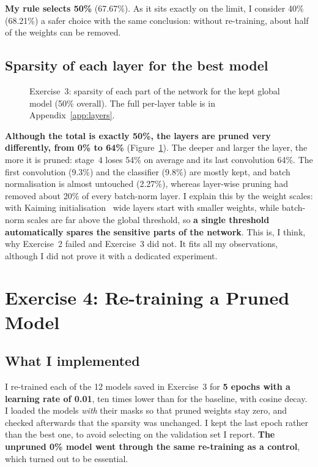 \documentclass[11pt,a4paper]{article}
\begin{document}
\textbf{My rule selects 50\%} (67.67\%). As it sits exactly on the limit, I consider 40\% (68.21\%) a safer choice with the same conclusion: without re-training, about half of the weights can be removed.

\subsection{Sparsity of each layer for the best model}

\begin{figure}[H]
\centering

\caption{Exercise~3: sparsity of each part of the network for the kept global model (50\% overall). The full per-layer table is in Appendix~\ref{app:layers}.}
\label{fig:layers}
\end{figure}

\textbf{Although the total is exactly 50\%, the layers are pruned very differently, from 0\% to 64\%} (Figure~\ref{fig:layers}). The deeper and larger the layer, the more it is pruned: stage~4 loses 54\% on average and its last convolution 64\%. The first convolution (9.3\%) and the classifier (9.8\%) are mostly kept, and batch normalisation is almost untouched (2.27\%), whereas layer-wise pruning had removed about 20\% of every batch-norm layer. I explain this by the weight scales: with Kaiming initialisation~\cite{he2015delving} wide layers start with smaller weights, while batch-norm scales are far above the global threshold, so \textbf{a single threshold automatically spares the sensitive parts of the network}. This is, I think, why Exercise~2 failed and Exercise~3 did not. It fits all my observations, although I did not prove it with a dedicated experiment.

\section{Exercise 4: Re-training a Pruned Model}

\subsection{What I implemented}
I re-trained each of the 12 models saved in Exercise~3 for \textbf{5 epochs with a learning rate of 0.01}, ten times lower than for the baseline, with cosine decay. I loaded the models \emph{with} their masks so that pruned weights stay zero, and checked afterwards that the sparsity was unchanged. I kept the last epoch rather than the best one, to avoid selecting on the validation set I report. \textbf{The unpruned 0\% model went through the same re-training as a control}, which turned out to be essential.
\end{document}
